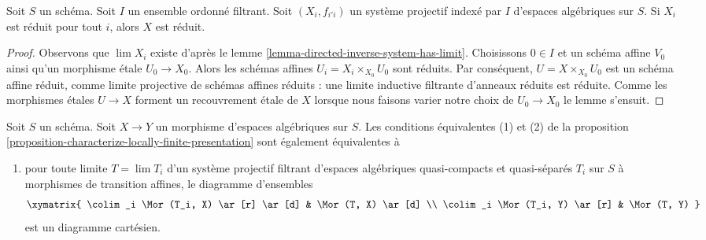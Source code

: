 \begin{lemma}
\label{lemma-directed-inverse-system-reduced}
Soit $S$ un schéma. Soit $I$ un ensemble ordonné filtrant.
Soit $(X_i, f_{i'i})$ un système projectif indexé par $I$
d'espaces algébriques sur $S$. Si $X_i$ est réduit
pour tout $i$, alors $X$ est réduit.
\end{lemma}

\begin{proof}
Observons que $\lim X_i$ existe d'après
le lemme \ref{lemma-directed-inverse-system-has-limit}.
Choisissons $0 \in I$ et un schéma affine $V_0$ ainsi qu'un morphisme \'etale
$U_0 \to X_0$. Alors les schémas affines
$U_i = X_i \times_{X_0} U_0$ sont réduits.
Par conséquent, $U = X \times_{X_0} U_0$
est un schéma affine réduit, comme limite projective de schémas affines réduits :
une limite inductive filtrante d'anneaux réduits est réduite.
Comme les morphismes \'etales $U \to X$ forment un
recouvrement \'etale de $X$ lorsque nous faisons varier notre choix de $U_0 \to X_0$
le lemme s'ensuit.
\end{proof}

\begin{lemma}
\label{lemma-better-characterize-relative-limit-preserving}
Soit $S$ un schéma. Soit $X \to Y$ un morphisme d'espaces algébriques
sur $S$. Les conditions équivalentes (1) et (2) de la
proposition \ref{proposition-characterize-locally-finite-presentation}
sont également équivalentes à
\begin{enumerate}
\item[(3)] pour toute limite $T = \lim T_i$ d'un système projectif filtrant
d'espaces algébriques quasi-compacts et quasi-séparés $T_i$ sur $S$ à morphismes de transition affines, le diagramme
d'ensembles
$$
\xymatrix{
\colim_i \Mor(T_i, X) \ar[r] \ar[d] & \Mor(T, X) \ar[d] \\
\colim_i \Mor(T_i, Y) \ar[r] & \Mor(T, Y)
}
$$
est un diagramme cartésien.
\end{enumerate}
\end{lemma}

